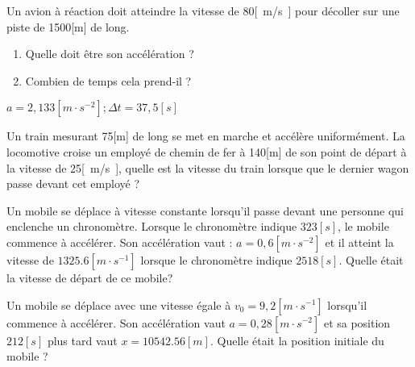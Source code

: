 \begin{exercise}
\end{exercise}

\begin{exercise}
  Un avion à réaction doit atteindre la vitesse de 80\unit{[m/s]} pour décoller sur une piste de 1500[m] de long.
  \begin{enumerate}[label=\alph*)]
    \item Quelle doit être son accélération ?
    \item Combien de temps cela prend-il ?
  \end{enumerate}
\end{exercise}
\begin{solution}
  \(a=2,133\unit{[m \cdot s^{-2}]} ; \Delta t=37,5\unit{[s]}\)
\end{solution}

\begin{exercise}[difficulty=**]
  Un train mesurant 75[m] de long se met en marche et accélère uniformément. La locomotive croise un employé de chemin de fer à 140[m] de son point de départ à la vitesse de 25\unit{[m/s]}, quelle est la vitesse du train lorsque que le dernier wagon passe devant cet employé ?
\end{exercise}

\begin{exercise}
  Un mobile se déplace à vitesse constante lorsqu'il passe devant une personne qui enclenche un chronomètre. Lorsque le chronomètre indique \(323\unit{[s]}\), le mobile commence à accélérer. Son accélération vaut : \(a=0,6\unit{[m \cdot s^{-2}]}\) et il atteint la vitesse de \(\num{1325,6}\unit{[m \cdot s^{-1}]}\) lorsque le chronomètre indique \(\num{2518}\unit{[s]}\). Quelle était la vitesse de départ de ce mobile?
\end{exercise}

\begin{exercise}
\end{exercise}

\begin{exercise}
  Un mobile se déplace avec une vitesse égale à \(v_0=9,2\unit{[m \cdot s^{-1}]}\) lorsqu'il commence à accélérer. Son accélération vaut \(a=0,28\unit{[m \cdot s^{-2}]}\) et sa position \(212\unit{[s]}\) plus tard vaut \(x=\num{10542,56}[m]\).
  Quelle était la position initiale du mobile ?
\end{exercise}


